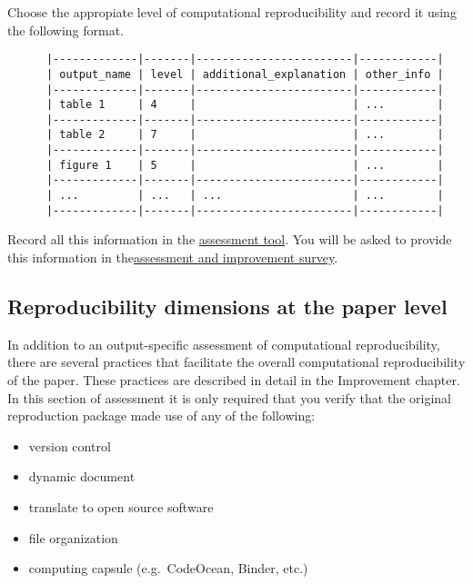 \documentclass[]{book}
\providecommand{\tightlist}{%
  \setlength{\itemsep}{0pt}\setlength{\parskip}{0pt}}
\begin{document}
Choose the appropiate level of computational reproducibility and record it using the following format.

\begin{verbatim}
      |-------------|-------|------------------------|------------|
      | output_name | level | additional_explanation | other_info |
      |-------------|-------|------------------------|------------|
      | table 1     | 4     |                        | ...        |
      |-------------|-------|------------------------|------------|
      | table 2     | 7     |                        | ...        |
      |-------------|-------|------------------------|------------|
      | figure 1    | 5     |                        | ...        |
      |-------------|-------|------------------------|------------|
      | ...         | ...   | ...                    | ...        |
      |-------------|-------|------------------------|------------|
\end{verbatim}

Record all this information in the \href{https://docs.google.com/spreadsheets/d/1LUIdVFH0OfR70C7z07TYeE-uWzKI_JIeWUMaYhqEKK0/edit\#gid=1384504774\&range=A1}{assessment tool}. You will be asked to provide this information in the\href{ADD\%20LINK}{assessment and improvement survey}.

\hypertarget{reproducibility-dimensions-at-the-paper-level}{%
\subsection{Reproducibility dimensions at the paper level}\label{reproducibility-dimensions-at-the-paper-level}}

In addition to an output-specific assessment of computational reproducibility, there are several practices that facilitate the overall computational reproducibility of the paper. These practices are described in detail in the Improvement chapter. In this section of assessment it is only required that you verify that the original reproduction package made use of any of the following:

\begin{itemize}
\tightlist
\item
  version control\\
\item
  dynamic document\\
\item
  translate to open source software\\
\item
  file organization\\
\item
  computing capsule (e.g.~CodeOcean, Binder, etc.)
\end{itemize}
\end{document}

